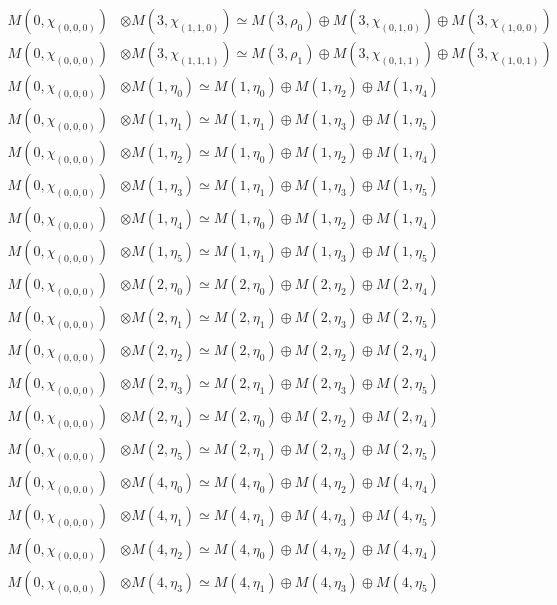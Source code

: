 \begin{align*}
M(0,\chi_{(0,0,0)}) &\otimes M(3,\chi_{(1,1,0)}) \simeq M(3,\rho_{0}) \oplus M(3,\chi_{(0,1,0)}) \oplus M(3,\chi_{(1,0,0)}) \\
M(0,\chi_{(0,0,0)}) &\otimes M(3,\chi_{(1,1,1)}) \simeq M(3,\rho_{1}) \oplus M(3,\chi_{(0,1,1)}) \oplus M(3,\chi_{(1,0,1)}) \\
M(0,\chi_{(0,0,0)}) &\otimes M(1,\eta_{0}) \simeq M(1,\eta_{0}) \oplus M(1,\eta_{2}) \oplus M(1,\eta_{4}) \\
M(0,\chi_{(0,0,0)}) &\otimes M(1,\eta_{1}) \simeq M(1,\eta_{1}) \oplus M(1,\eta_{3}) \oplus M(1,\eta_{5}) \\
M(0,\chi_{(0,0,0)}) &\otimes M(1,\eta_{2}) \simeq M(1,\eta_{0}) \oplus M(1,\eta_{2}) \oplus M(1,\eta_{4}) \\
M(0,\chi_{(0,0,0)}) &\otimes M(1,\eta_{3}) \simeq M(1,\eta_{1}) \oplus M(1,\eta_{3}) \oplus M(1,\eta_{5}) \\
M(0,\chi_{(0,0,0)}) &\otimes M(1,\eta_{4}) \simeq M(1,\eta_{0}) \oplus M(1,\eta_{2}) \oplus M(1,\eta_{4}) \\
M(0,\chi_{(0,0,0)}) &\otimes M(1,\eta_{5}) \simeq M(1,\eta_{1}) \oplus M(1,\eta_{3}) \oplus M(1,\eta_{5}) \\
M(0,\chi_{(0,0,0)}) &\otimes M(2,\eta_{0}) \simeq M(2,\eta_{0}) \oplus M(2,\eta_{2}) \oplus M(2,\eta_{4}) \\
M(0,\chi_{(0,0,0)}) &\otimes M(2,\eta_{1}) \simeq M(2,\eta_{1}) \oplus M(2,\eta_{3}) \oplus M(2,\eta_{5}) \\
M(0,\chi_{(0,0,0)}) &\otimes M(2,\eta_{2}) \simeq M(2,\eta_{0}) \oplus M(2,\eta_{2}) \oplus M(2,\eta_{4}) \\
M(0,\chi_{(0,0,0)}) &\otimes M(2,\eta_{3}) \simeq M(2,\eta_{1}) \oplus M(2,\eta_{3}) \oplus M(2,\eta_{5}) \\
M(0,\chi_{(0,0,0)}) &\otimes M(2,\eta_{4}) \simeq M(2,\eta_{0}) \oplus M(2,\eta_{2}) \oplus M(2,\eta_{4}) \\
M(0,\chi_{(0,0,0)}) &\otimes M(2,\eta_{5}) \simeq M(2,\eta_{1}) \oplus M(2,\eta_{3}) \oplus M(2,\eta_{5}) \\
M(0,\chi_{(0,0,0)}) &\otimes M(4,\eta_{0}) \simeq M(4,\eta_{0}) \oplus M(4,\eta_{2}) \oplus M(4,\eta_{4}) \\
M(0,\chi_{(0,0,0)}) &\otimes M(4,\eta_{1}) \simeq M(4,\eta_{1}) \oplus M(4,\eta_{3}) \oplus M(4,\eta_{5}) \\
M(0,\chi_{(0,0,0)}) &\otimes M(4,\eta_{2}) \simeq M(4,\eta_{0}) \oplus M(4,\eta_{2}) \oplus M(4,\eta_{4}) \\
M(0,\chi_{(0,0,0)}) &\otimes M(4,\eta_{3}) \simeq M(4,\eta_{1}) \oplus M(4,\eta_{3}) \oplus M(4,\eta_{5}) \\

\end{align*}
